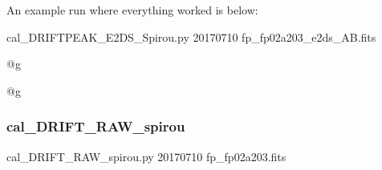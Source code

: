 An example run where everything worked is below:
\begin{cmdbox}[title={example}]
cal_DRIFTPEAK_E2DS_Spirou.py 20170710 fp_fp02a203_e2ds_AB.fits
\end{cmdbox}
\begin{cmdboxprintspecial}[fontupper=\tiny, fontlower=\tiny]
@g

@g
\end{cmdboxprintspecial}


\subsubsection{cal\_DRIFT\_RAW\_spirou}

\begin{cmdbox}[title={example}]
cal_DRIFT_RAW_spirou.py 20170710 fp_fp02a203.fits
\end{cmdbox}
